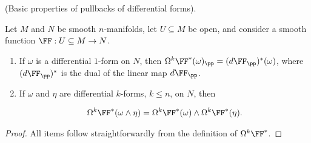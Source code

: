 \begin{theorem}
    (Basic properties of pullbacks of differential forms).
    
    Let $M$ and $N$ be smooth $n$-manifolds, let $U \subseteq M$ be open, and consider a smooth function $\FF:U \subseteq M \rightarrow N$.
    
    \begin{enumerate}
        \item If $\omega$ is a differential $1$-form on $N$, then $\Omega^k \FF^*(\omega)_\pp = (d\FF_\pp)^*(\omega)$, where $(d\FF_\pp)^*$ is the dual of the linear map $d\FF_\pp$.
    
        \item If $\omega$ and $\eta$ are differential $k$-forms, $k \leq n$, on $N$, then
        
        \begin{align*}
            \Omega^k \FF^* (\omega \wedge \eta) = \Omega^k \FF^*(\omega) \wedge \Omega^k \FF^*(\eta).
        \end{align*}
        
        
        
    \end{enumerate}
\end{theorem}

\begin{proof}
    All items follow straightforwardly from the definition of $\Omega^k \FF^*$.
\end{proof}

